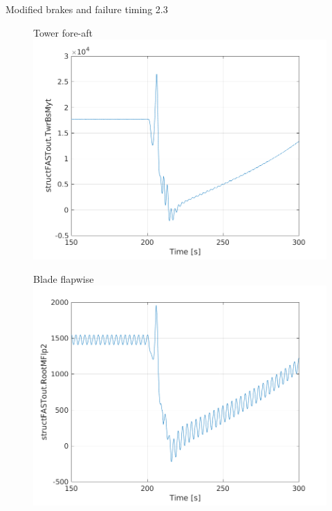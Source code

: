 \documentclass[12pt,t]{beamer}
\begin{document}
\begin{frame}
\Large
Modified brakes and failure timing 2.3
\begin{figure}[H]
  \centering
\begin{minipage}{0.38\textwidth}
          \centering
            \footnotesize
    Tower fore-aft
  \includegraphics[width=1\linewidth]{../CIP_6/FASTextreme/EOG_50_brake/TwrBsMyt.png} \\
\end{minipage}
\begin{minipage}{0.38\textwidth}
          \centering
            \footnotesize
    Blade flapwise
  \includegraphics[width=1\linewidth]{../CIP_6/FASTextreme/EOG_50_brake/RootMFlp2.png}\\

\end{minipage}
\end{figure}
\end{frame}
\end{document}
